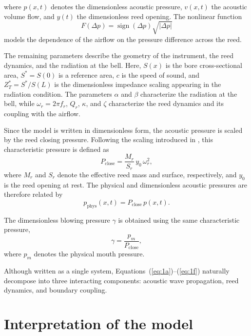 \documentclass[11pt,a4paper]{report}
\theoremstyle{plain}
\theoremstyle{definition}
\begin{document}
where $p(x,t)$ denotes the dimensionless acoustic pressure, $v(x,t)$ the
acoustic volume flow, and $y(t)$ the dimensionless reed opening. The nonlinear
function
\begin{equation}
    F(\Delta p)
    =
    \operatorname{sign}(\Delta p)\sqrt{|\Delta p|}
\end{equation}
models the dependence of the airflow on the pressure difference across the reed.

The remaining parameters describe the geometry of the instrument, the reed
dynamics, and the radiation at the bell. Here, $S(x)$ is the bore
cross-sectional area, $S^\ast=S(0)$ is a reference area, $c$ is the speed of
sound, and $Z_T^\ast=S^\ast/S(L)$ is the dimensionless impedance scaling
appearing in the radiation condition. The parameters $\alpha$ and $\beta$
characterize the radiation at the bell, while $\omega_r=2\pi f_r$, $Q_r$,
$\kappa$, and $\zeta$ characterize the reed dynamics and its coupling with the
airflow.

Since the model is written in dimensionless form, the acoustic pressure is
scaled by the reed closing pressure. Following the scaling introduced in
\cite{chabassier:hal-03794382}, this characteristic pressure is defined as
\begin{equation}
    P_{\mathrm{close}}
    =
    \frac{M_r}{S_r}\,y_0\,\omega_r^2,
    \label{eq:closing_pressure}
\end{equation}
where $M_r$ and $S_r$ denote the effective reed mass and surface,
respectively, and $y_0$ is the reed opening at rest. The physical and
dimensionless acoustic pressures are therefore related by
\begin{equation}
    p_{\mathrm{phys}}(x,t)
    =
    P_{\mathrm{close}}\,p(x,t).
    \label{eq:pressure_scaling}
\end{equation}

The dimensionless blowing pressure $\gamma$ is obtained using the same
characteristic pressure,
\begin{equation}
    \gamma
    =
    \frac{p_m}{P_{\mathrm{close}}},
    \label{eq:gamma_scaling}
\end{equation}
where $p_m$ denotes the physical mouth pressure.

Although written as a single system, Equations~(\ref{eq:1a})--(\ref{eq:1f})
naturally decompose into three interacting components: acoustic wave
propagation, reed dynamics, and boundary coupling.

\section{Interpretation of the model}
\end{document}
